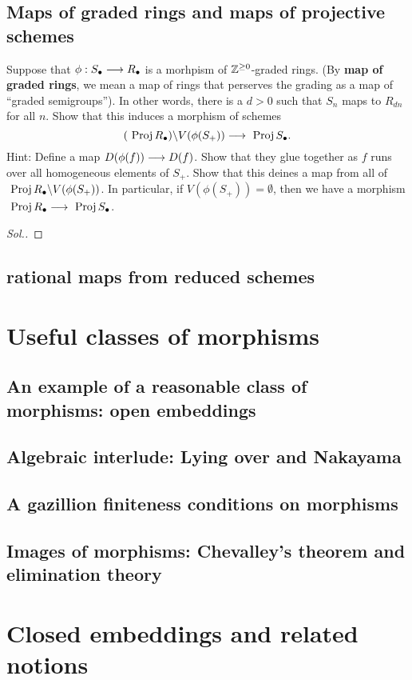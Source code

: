\documentclass[11pt]{book} %
\begin{document}
\section{Maps of graded rings and maps of projective schemes}
\begin{exr}
Suppose that $\phi:S_\bullet\longrightarrow R_\bullet$ is a morhpism of $\mathbb Z^{\geq 0}$-graded rings. (By \textbf{ map of graded rings}, we mean a map of rings that perserves the grading as a map of ``graded semigroups''). In other words, there is a $d> 0$ such that $S_n$ maps to $R_{dn}$ for all $n$. Show that this induces  a morphism of schemes
$$
(\text{ Proj\,} R_\bullet)\backslash V(\phi(S_+))\longrightarrow \text{ Proj\,} S_\bullet.
$$
Hint:
Define a map $D(\phi(f))\longrightarrow D(f)$. Show that they glue together as $f$ runs over all homogeneous elements of $S_+$. Show that this deines a map from all of $\text{ Proj\,} R_\bullet\backslash V(\phi(S_+))$. In particular, if $V(\phi(S_+))=\emptyset$, then we have a morphism $\text{ Proj\,} R_\bullet\longrightarrow \text{ Proj\,} S_\bullet$. 
\end{exr}
\begin{proof}[Sol.]
\end{proof}

\section{rational maps from reduced schemes}

\chapter{Useful classes of morphisms}
\section{An example of a reasonable class of morphisms: open embeddings}
\section{Algebraic interlude: Lying over and Nakayama}
\section{A gazillion finiteness conditions on morphisms}
\section{Images of morphisms: Chevalley's theorem and elimination theory}
\chapter{Closed embeddings and related notions}
\end{document}
